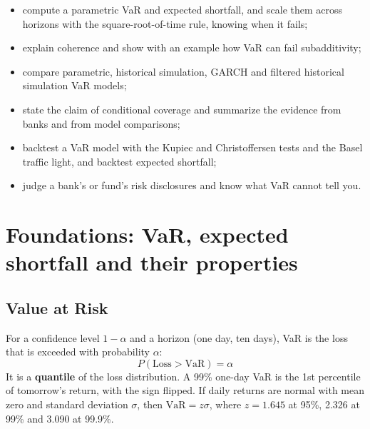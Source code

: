 \begin{itemize}
  \item compute a parametric VaR and expected shortfall, and scale them across horizons with the square-root-of-time rule, knowing when it fails;
  \item explain coherence and show with an example how VaR can fail subadditivity;
  \item compare parametric, historical simulation, GARCH and filtered historical simulation VaR models;
  \item state the claim of conditional coverage and summarize the evidence from banks and from model comparisons;
  \item backtest a VaR model with the Kupiec and Christoffersen tests and the Basel traffic light, and backtest expected shortfall;
  \item judge a bank's or fund's risk disclosures and know what VaR cannot tell you.
\end{itemize}

\section{Foundations: VaR, expected shortfall and their properties}
\label{sec:15-foundations}

\subsection{Value at Risk}

For a confidence level $1 - \alpha$ and a horizon (one day, ten days), VaR is the loss that is exceeded with probability $\alpha$:
\begin{equation}
  P(\text{Loss} > \mathrm{VaR}) = \alpha
  \label{eq:15-var}
\end{equation}
It is a \textbf{quantile} of the loss distribution. A 99\% one-day VaR is the 1st percentile of tomorrow's return, with the sign flipped. If daily returns are normal with mean zero and standard deviation $\sigma$, then $\mathrm{VaR} = z\sigma$, where $z = 1.645$ at 95\%, 2.326 at 99\% and 3.090 at 99.9\%.

